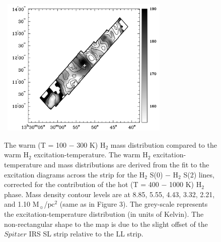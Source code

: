 \documentclass[manuscript]{aastex}
\begin{document}
\begin{figure}[!h]
\centerline{\hbox{\hspace{0.0in}
\includegraphics[width=8cm,angle=0]{bw_warm_h2.jpg}}}
\caption{The warm (T = 100 $-$ 300 K) $\mathrm{H_2}$ mass distribution compared to the warm $\mathrm{H_2}$ excitation-temperature.  The warm $\mathrm{H_2}$ excitation-temperature and mass distributions are derived from the fit to the excitation diagrams across the strip for the $\mathrm{H_2}$ S(0) $-$ $\mathrm{H_2}$ S(2) lines, corrected for the contribution of the hot (T = 400 $-$ 1000 K) $\mathrm{H_2}$ phase.  Mass density contour levels are at 8.85, 5.55, 4.43, 3.32, 2.21, and 1.10 $\mathrm{M_\sun}$/$\mathrm{pc^2}$ (same as in Figure 3).
The grey-scale represents the excitation-temperature distribution (in units of Kelvin).  The non-rectangular shape to the map is due to the slight offset of the $Spitzer$ IRS SL strip relative to the LL strip.  \label{fig4}}
\end{figure}
\end{document}
